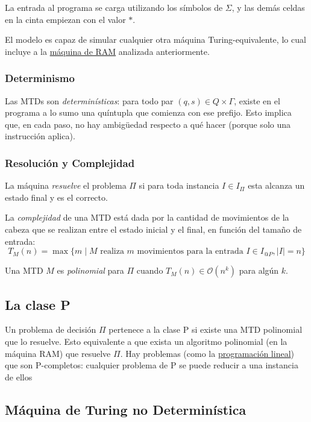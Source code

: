 \documentclass[a4paper]{report}
\newcommand{\BigO}[1]{\ensuremath{\mathcal{O}(#1)}}
\begin{document}
La entrada al programa se carga utilizando los símbolos de $\Sigma$, y las demás celdas en la cinta empiezan con el valor $\ast$.

El modelo es capaz de simular cualquier otra máquina Turing-equivalente, lo cual incluye a la \hyperref[maquina-ram]{máquina de RAM} analizada anteriormente.

\subsubsection{Determinismo}

Las MTDs son \textit{determinísticas}: para todo par $(q, s) \in Q \times \Gamma$, existe en el programa a lo sumo una quíntupla que comienza con ese prefijo. Esto implica que, en cada paso, no hay ambigüedad respecto a qué hacer (porque solo una instrucción aplica).

\subsubsection{Resolución y Complejidad}

La máquina \textit{resuelve} el problema $\Pi$ si para toda instancia $I \in I_{\Pi}$ esta alcanza un estado final y es el correcto.

La \textit{complejidad} de una MTD está dada por la cantidad de movimientos de la cabeza que se realizan entre el estado inicial y el final, en función del tamaño de entrada:
    $$T_M(n) = \max\{m \mid M \text{ realiza $m$ movimientos para la entrada $I \in I_{@P}, |I| = n$}\}$$

Una MTD $M$ es \textit{polinomial} para $\Pi$ cuando $T_M(n) \in \BigO{n^k}$ para algún $k$.

\subsection{La clase P}

Un problema de decisión $\Pi$ pertenece a la clase P si existe una MTD polinomial que lo resuelve. Esto equivalente a que exista un algoritmo polinomial (en la máquina RAM) que resuelve $\Pi$. Hay problemas (como la \hyperref[programacion-lineal]{programación lineal}) que son P-completos: cualquier problema de P se puede reducir a una instancia de ellos

\subsection{Máquina de Turing no Determinística}
\end{document}
